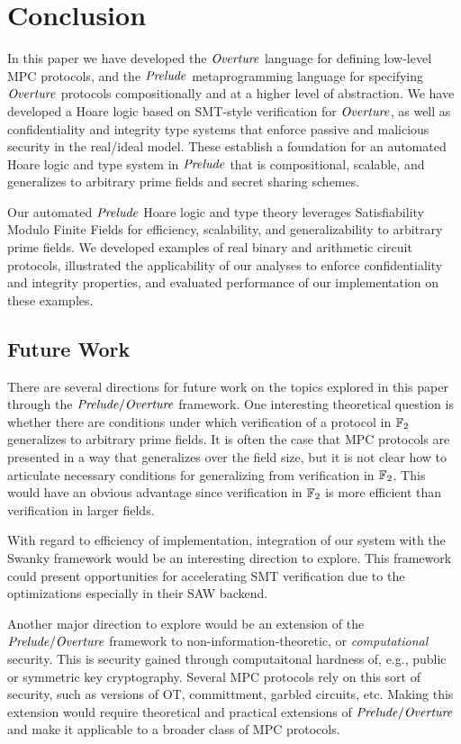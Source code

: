 \section{Conclusion}
\label{section-conclusion}

In this paper we have developed the $\mathit{Overture}$ language for defining
low-level MPC protocols, and the $\mathit{Prelude}$ metaprogramming language
for specifying $\mathit{Overture}$ protocols compositionally and at a higher
level of abstraction. We have developed a Hoare logic based on
SMT-style verification for $\mathit{Overture}$, as well as confidentiality and
integrity type systems that enforce passive and malicious security in
the real/ideal model. These establish a foundation for an automated
Hoare logic and type system in $\mathit{Prelude}$ that is compositional,
scalable, and generalizes to arbitrary prime fields and secret sharing
schemes.

Our automated $\mathit{Prelude}$ Hoare logic and type theory leverages
Satisfiability Modulo Finite Fields for efficiency, scalability, and
generalizability to arbitrary prime fields. We developed examples of
real binary and arithmetic circuit protocols, illustrated the
applicability of our analyses to enforce confidentiality and integrity
properties, and evaluated performance of our implementation on these
examples.

\subsection{Future Work}

There are several directions for future work on the topics explored in
this paper through the $\mathit{Prelude}/\mathit{Overture}$ framework. One interesting
theoretical question is whether there are conditions under which
verification of a protocol in $\mathbb{F}_{2}$ generalizes to arbitrary
prime fields. It is often the case that MPC protocols are presented in
a way that generalizes over the field size, but it is not clear how to
articulate necessary conditions for generalizing from verification in
$\mathbb{F}_{2}$. This would have an obvious advantage since verification in
$\mathbb{F}_{2}$ is more efficient than verification in larger fields.

With regard to efficiency of implementation, integration of our system
with the Swanky framework \cite{swanky} would be an interesting
direction to explore. This framework could present opportunities for
accelerating SMT verification due to the optimizations especially
in their SAW backend.

Another major direction to explore would be an extension of the
$\mathit{Prelude}/\mathit{Overture}$ framework to non-information-theoretic, or
\emph{computational} security. This is security gained through
computaitonal hardness of, e.g., public or symmetric key cryptography.
Several MPC protocols rely on this sort of security, such as versions
of OT, committment, garbled circuits, etc. Making this extension would
require theoretical and practical extensions of $\mathit{Prelude}/\mathit{Overture}$
and make it applicable to a broader class of MPC protocols.
